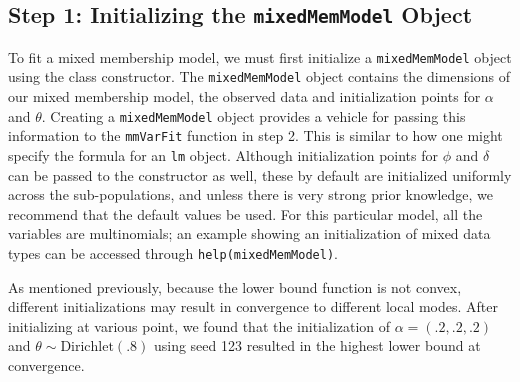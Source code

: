 \documentclass{article}\usepackage[]{graphicx}\usepackage[]{color}
\begin{document}
\subsection{Step 1: Initializing the \texttt{mixedMemModel} Object}
To fit a mixed membership model, we must first initialize a \texttt{mixedMemModel} object using the class constructor. The \texttt{mixedMemModel} object contains the dimensions of our mixed membership model, the observed data and initialization points for $\alpha$ and $\theta$. Creating a \texttt{mixedMemModel} object provides a vehicle for passing this information to the \texttt{mmVarFit} function in step 2. This is similar to how one might specify the formula for an \texttt{lm} object. Although initialization points for $\phi$ and $\delta$ can be passed to the constructor as well, these by default are initialized uniformly across the sub-populations, and unless there is very strong prior knowledge, we recommend that the default values be used. For this particular model, all the variables are multinomials; an example showing an initialization of mixed data types can be accessed through \texttt{help(mixedMemModel)}.

As mentioned previously, because the lower bound function is not convex, different initializations may result in convergence to different local modes. After initializing at various point, we found that the initialization of $\alpha = \left(.2, .2, .2\right)$ and $\theta \sim \text{Dirichlet}(.8)$ using seed 123 resulted in the highest lower bound at convergence.  
\end{document}
